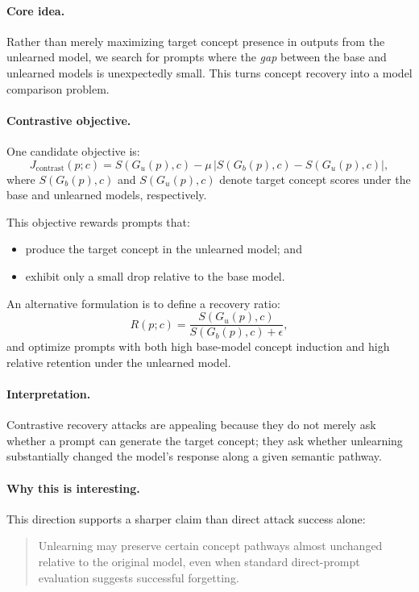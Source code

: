 \paragraph{Core idea.}
Rather than merely maximizing target concept presence in outputs from the unlearned model, we search for prompts where the \emph{gap} between the base and unlearned models is unexpectedly small. This turns concept recovery into a model comparison problem.

\paragraph{Contrastive objective.}
One candidate objective is:
\begin{equation}
J_{\mathrm{contrast}}(p;c)
=
S(G_u(p), c)
-
\mu \, \bigl| S(G_b(p), c) - S(G_u(p), c) \bigr|,
\label{eq:contrastive_objective}
\end{equation}
where $S(G_b(p), c)$ and $S(G_u(p), c)$ denote target concept scores under the base and unlearned models, respectively.

This objective rewards prompts that:
\begin{itemize}
    \item produce the target concept in the unlearned model; and
    \item exhibit only a small drop relative to the base model.
\end{itemize}

An alternative formulation is to define a recovery ratio:
\begin{equation}
R(p;c) = \frac{S(G_u(p), c)}{S(G_b(p), c) + \epsilon},
\label{eq:recovery_ratio}
\end{equation}
and optimize prompts with both high base-model concept induction and high relative retention under the unlearned model.

\paragraph{Interpretation.}
Contrastive recovery attacks are appealing because they do not merely ask whether a prompt can generate the target concept; they ask whether unlearning substantially changed the model's response along a given semantic pathway.

\paragraph{Why this is interesting.}
This direction supports a sharper claim than direct attack success alone:
\begin{quote}
Unlearning may preserve certain concept pathways almost unchanged relative to the original model, even when standard direct-prompt evaluation suggests successful forgetting.
\end{quote}

